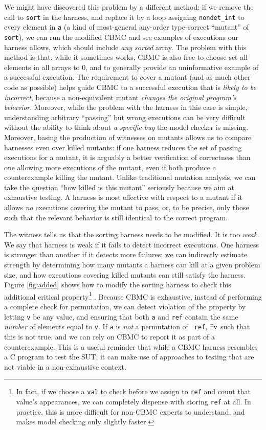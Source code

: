 \documentclass[conference]{IEEEtran}
\begin{document}
We might have discovered this problem by a different method: if we
remove the call to {\tt sort} in the harness, and replace it by a loop
assigning {\tt nondet\_int} to every element in {\tt a} (a kind of
most-general any-order type-correct ``mutant'' of {\tt sort}), we can run
the modified CBMC and see examples of executions our harness allows,
which should include \emph{any sorted} array.  The problem with this
method is that, while it sometimes works, CBMC is also free to choose
set all elements in all arrays to 0, and to generally provide an
uninformative example of a successful execution.  The requirement to
cover a mutant (and as much other code as possible) helps guide CBMC
to a successful execution that is \emph{likely to be incorrect},
because a non-equivalent mutant \emph{changes the original program's behavior}.  Moreover, while the
problem with the harness in this case is simple, understanding
arbitrary ``passing'' but wrong executions can be very difficult
without the ability to think about \emph{a specific bug} the model
checker is missing.  Moreover, basing the production of witnesses on
mutants allows us to compare harnesses even over killed mutants:  if
one harness reduces the set of passing executions for a mutant, it is
arguably a better verification of correctness than one allowing more
executions of the mutant, even if both produce a counterexample
killing the mutant.  Unlike traditional mutation analysis, we can take
the question ``how killed is this mutant'' seriously because we aim at
exhaustive testing.  A harness is most effective with respect to a
mutant if it allows \emph{no} executions covering the mutant to pass,
or, to be precise, only those such that the relevant behavior is still identical
to the correct program.

The witness tells us that the sorting harness needs to be modified.
It is too \emph{weak}.  We say that harness is weak if it fails to
detect incorrect executions.  One harness is stronger than another if
it detects more failures; we can indirectly estimate strength by
determining how many mutants a harness can kill at a given problem
size, and how executions covering killed mutants can still satisfy the
harness.  Figure \ref{fig:added} shows how to modify the sorting
harness to check this additional critical property\footnote{In fact,
  if we choose a {\tt val} to check before we assign to {\tt ref} and
  count that value's appearances, we can completely dispense with
  storing {\tt ref} at all.  In practice, this is more difficult for
  non-CBMC experts to understand, and makes model checking only
  slightly faster.} .  Because CBMC is exhaustive, instead of
performing a complete check for permutation, we can detect violation
of the property by letting {\tt v} be any value, and ensuring that
both {\tt a} and {\tt ref} contain the same \emph{number} of elements
equal to {\tt v}.  If {\tt a} is \emph{not} a permutation of {\tt
  ref}, $\exists {\tt v}$ such that this is not true, and we can rely
on CBMC to report it as part of a counterexample.  This is a useful
reminder that while a CBMC harness resembles a C program to test the
SUT, it can make use of approaches to testing that are not viable in a
non-exhaustive context.
\end{document}
